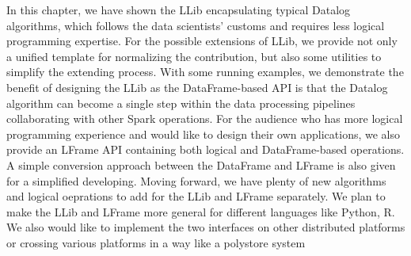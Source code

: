 In this chapter, we have shown the LLib encapsulating typical Datalog algorithms, which follows the data scientists' customs  and requires less logical programming expertise.  For the possible  extensions of LLib, we provide not only a unified template for normalizing the contribution, but also some utilities to simplify the extending process.  With some running examples, we  demonstrate the benefit of designing the LLib as the DataFrame-based API is that the Datalog algorithm can  become a single step within the data processing pipelines collaborating with other Spark operations. For the audience who has more logical programming experience and would like to design their own applications, we also provide an LFrame API containing both logical and DataFrame-based operations. A simple conversion approach between the DataFrame and LFrame is also given for a simplified developing. Moving forward, we have  plenty of new algorithms and logical oeprations to add for the LLib and LFrame separately. We plan to make the LLib and LFrame more general for different languages like Python, R. We also  would like to implement the two interfaces on other distributed platforms or crossing various platforms in a way like a polystore system \citep{duggan2015bigdawg}
